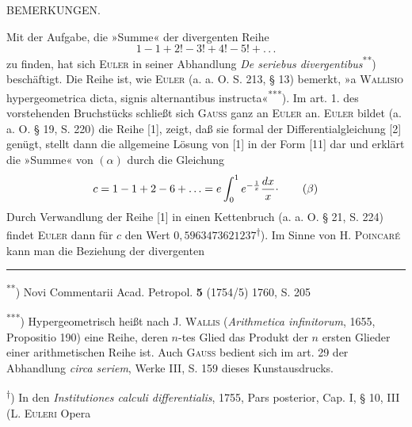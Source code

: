 \begingroup
\small
\makeatletter\tagsleft@true\let\veqno\@@leqno\makeatother
\begin{center}BEMERKUNGEN.\end{center}
\noindent\hspace*{\parindent}Mit der Aufgabe, die »Summe« der divergenten Reihe
\begin{equation}
1-1+2!-3!+4!-5!+{.}\,{.}\,{.}\tag*{(\(\alpha\))}
\end{equation}
\noindent zu finden, hat sich \textsc{Euler} in seiner Abhandlung \textit{De seriebus divergentibus}\textsuperscript{**}) beschäftigt. Die Reihe ist, wie \textsc{Euler} (a. a. O. S. 213, § 13) bemerkt, »a \textsc{Wallisio} hypergeometrica dicta, signis alternantibus instructa«\textsuperscript{***}). Im art. 1. des vorstehenden Bruchstücks schließt sich \textsc{Gauss} ganz an \textsc{Euler} an. \textsc{Euler} bildet (a. a. O. § 19, S. 220) die Reihe [1], zeigt, daß sie formal der Differentialgleichung [2] genügt, stellt dann die allgemeine Lösung von [1] in der Form [11] dar und erklärt die »Summe« von \((\alpha)\) durch die Gleichung
\begin{equation}
c=1-1+2-6+{.}\,{.}\,{.}=e\int_0^1e^{-\frac1x}\frac{dx}{x}\mathpunct{\raisebox{.45ex}{.}}\tag*{(\(\beta\))}
\end{equation}
\noindent Durch Verwandlung der Reihe [1] in einen Kettenbruch (a. a. O. § 21, S. 224) findet \textsc{Euler} dann für \(c\) den Wert \(0{,}5963473621237\)\textsuperscript{\(\dagger\)}). Im Sinne von H. \textsc{Poincaré} kann man die Beziehung der divergenten
\par\medskip\noindent\rule{.24\linewidth}{.4pt}\par\smallskip
{\footnotesize
\noindent\hspace*{\parindent}\textsuperscript{**}) Novi Commentarii Acad. Petropol. \textbf{5} (1754/5) 1760, S. 205
\par\noindent\hspace*{\parindent}\textsuperscript{***}) Hypergeometrisch heißt nach J. \textsc{Wallis} (\textit{Arithmetica infinitorum}, 1655, Propositio 190) eine Reihe, deren \(n\)-tes Glied das Produkt der \(n\) ersten Glieder einer arithmetischen Reihe ist. Auch \textsc{Gauss} bedient sich im art. 29 der Abhandlung \textit{circa seriem}, Werke III, S. 159 dieses Kunstausdrucks.
\par\noindent\hspace*{\parindent}\textsuperscript{\(\dagger\)}) In den \textit{Institutiones calculi differentialis}, 1755, Pars posterior, Cap. I, § 10, III (L. \textsc{Euleri} Opera
\par}
